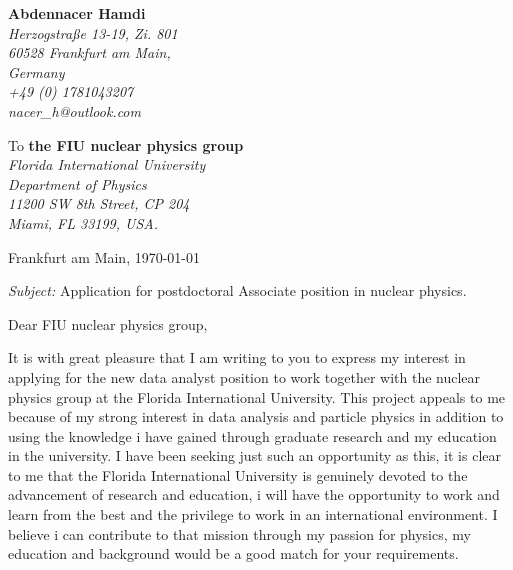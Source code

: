\documentclass[11pt]{letter}
\begin{document}
 \sffamily
 \hfill
 \begin{flushleft}
 {\bfseries Abdennacer Hamdi}\\[.35ex]
 \small\itshape
 Herzogstra{\ss}e 13-19, Zi. 801 \\
 60528 Frankfurt am Main, \\
 Germany \\[.35ex]
 +49 (0) 1781043207 \\
 nacer\_h@outlook.com
 \end{flushleft}
 \begin{flushleft}
 To {\bfseries the FIU nuclear physics group}\\[.35ex]
 \small\itshape
 Florida International University \\
 Department of Physics \\
 11200 SW 8th Street, CP 204 \\
 Miami, FL 33199, USA.

 \end{flushleft}
 \hfill
 \begin{flushleft}
 Frankfurt am Main, \today \\
 
 \end{flushleft}
\textit{Subject:} Application for postdoctoral Associate position in nuclear physics.\\
\par Dear FIU nuclear physics group,
~\par It is with great pleasure that I am writing to you to express my interest in applying for the new data analyst position to work together with the nuclear physics group at the Florida International University. This project appeals to me because of my strong interest in data analysis and particle physics in addition to using the knowledge i have gained through graduate research and my education in the university. I have been seeking just such an opportunity as this, it is clear to me that the Florida International University is genuinely devoted to the advancement of research and education, i will have the opportunity to work and learn from the best and the privilege to work in an international environment. I believe i can contribute to that mission through my passion for physics, my education and background would be a good match for your requirements.
\end{document}
